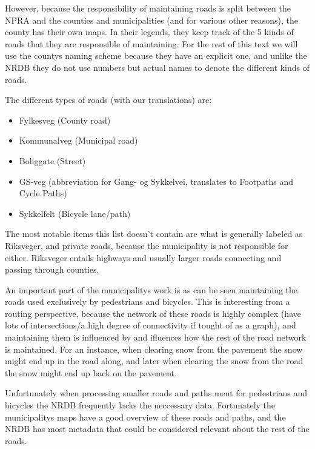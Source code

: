 However, because the responsibility of maintaining roads is split between the NPRA and the counties and municipalities (and for various other reasons), the county has their own maps. In their legends, they keep track of the 5 kinds of roads that they are responsible of maintaining. For the rest of this text we will use the countys naming scheme because they have an explicit one, and unlike the NRDB they do not use numbers but actual names to denote the different kinds of roads.

The different types of roads (with our translations) are:
\begin{itemize}
	\item Fylkesveg (County road)
	\item Kommunalveg (Municipal road)
	\item Boliggate (Street)
	\item GS-veg (abbreviation for Gang- og Sykkelvei, translates to Footpaths and Cycle Paths) %
	\item Sykkelfelt (Bicycle lane/path)
\end{itemize}

The most notable items this list doesn't contain are what is generally labeled as Riksveger, and private roads, because the municipality is not responsible for either. Riksveger entails highways and usually larger roads connecting and passing through counties.

An important part of the municipalitys work is as can be seen maintaining the roads used exclusively by pedestrians and bicycles. This is interesting from a routing perspective, because the network of these roads is highly complex (have lots of intersections/a high degree of connectivity if tought of as a graph), and maintaining them is influenced by and ifluences how the rest of the road network is maintained. For an instance, when clearing snow from the pavement the snow might end up in the road along, and later when clearing the snow from the road the snow might end up back on the pavement.

Unfortunately when processing smaller roads and paths ment for pedestrians and bicycles the NRDB frequently lacks the neccessary data. Fortunately the municipalitys maps have a good overview of these roads and paths, and the NRDB has most metadata that could be considered relevant about the rest of the roads.

